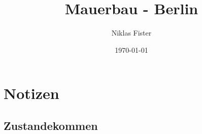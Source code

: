 \documentclass{article}
\title{\Huge\textbf{Mauerbau - Berlin}}
\author{Niklas Fister}
\date{\today}
\begin{document}
\maketitle
\newpage
\section{Notizen}
\subsection{Zustandekommen}
\end{document}
